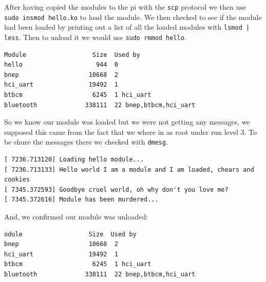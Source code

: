 \documentclass[a4paper,oneside,onecolumn]{article}
\newcommand{\code}[1]{\colorbox{codegray}{\texttt{#1}}}
\begin{document}
After having copied the modules to the pi with the \code{scp} protocol we then use \code{sudo insmod hello.ko} to load the module. We then checked to see if the module had been loaded by printing out a list of all the loaded modules with \code{lsmod | less}. Then to unload it we would use \code{sudo rmmod hello}.
\begin{lstlisting}
Module                  Size  Used by
hello                    944  0 
bnep                   10668  2 
hci_uart               19492  1 
btbcm                   6245  1 hci_uart
bluetooth             338111  22 bnep,btbcm,hci_uart
\end{lstlisting}
So we know our module was loaded but we were not getting any messages, we supposed this came from the fact that we where in as root under run level 3. To be shure the messages there we checked with \code{dmesg}.
\begin{lstlisting}
[ 7236.713120] Loading hello module...
[ 7236.713133] Hello world I am a module and I am loaded, chears and cookies 
[ 7345.372593] Goodbye cruel world, oh why don't you love me?
[ 7345.372616] Module has been murdered...
\end{lstlisting}
And, we confirmed our module was unloaded:
\begin{lstlisting}
odule                  Size  Used by
bnep                   10668  2 
hci_uart               19492  1 
btbcm                   6245  1 hci_uart
bluetooth             338111  22 bnep,btbcm,hci_uart
\end{lstlisting}
\end{document}
